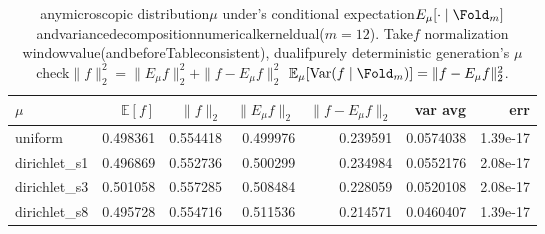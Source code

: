\begin{table}[H]
\centering
\scriptsize
\setlength{\tabcolsep}{4pt}
\caption{anymicroscopic distribution$\mu$ under's conditional expectation$E_{\mu}[\cdot\mid \Fold_m]$ andvariancedecompositionnumericalkerneldual($m=12$). Take$f$ normalization windowvalue(andbeforeTableconsistent), dualifpurely deterministic generation's  $\mu$ check$\|f\|_2^2=\|E_{\mu}f\|_2^2+\|f-E_{\mu}f\|_2^2$ $\mathbb E_{\mu}[\mathrm{Var}(f\mid\Fold_m)]=\|f-E_{\mu}f\|_2^2$. }
\label{tab:fold_conditional_variance_decomposition}
\begin{tabular}{lrrrrrr}
\toprule
$\mu$ & $\mathbb E[f]$ & $\|f\|_2$ & $\|E_{\mu}f\|_2$ & $\|f-E_{\mu}f\|_2$ & var avg & err\\
\midrule
uniform & 0.498361 & 0.554418 & 0.499976 & 0.239591 & 0.0574038 & 1.39e-17\\
dirichlet\_s1 & 0.496869 & 0.552736 & 0.500299 & 0.234984 & 0.0552176 & 2.08e-17\\
dirichlet\_s3 & 0.501058 & 0.557285 & 0.508484 & 0.228059 & 0.0520108 & 2.08e-17\\
dirichlet\_s8 & 0.495728 & 0.554716 & 0.511536 & 0.214571 & 0.0460407 & 1.39e-17\\
\bottomrule
\end{tabular}
\end{table}

